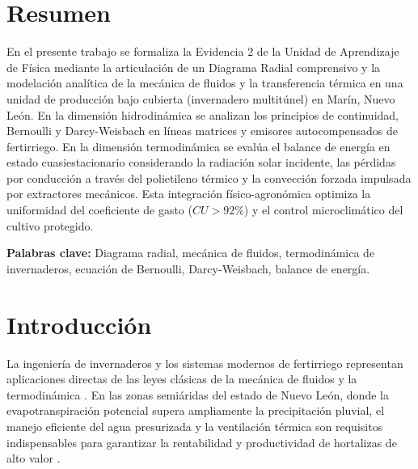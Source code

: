 \documentclass[spanish,letterpaper,oneside]{article}
\begin{document}
\hypersetup{pageanchor=false}
\begingroup
\fontsize{14}{17}\selectfont
\renewcommand{\Huge}{\fontsize{14}{17}\selectfont\bfseries}
\renewcommand{\large}{\fontsize{14}{17}\selectfont}
\templatePortrait
\clearpage
\endgroup
\hypersetup{pageanchor=true}
\templatePagecfg
\singlespacing
\setlength{\tabcolsep}{8pt}
\renewcommand{\arraystretch}{1.18}

\section*{Resumen}
En el presente trabajo se formaliza la Evidencia 2 de la Unidad de Aprendizaje de Física mediante la articulación de un Diagrama Radial comprensivo y la modelación analítica de la mecánica de fluidos y la transferencia térmica en una unidad de producción bajo cubierta (invernadero multitúnel) en Marín, Nuevo León. En la dimensión hidrodinámica se analizan los principios de continuidad, Bernoulli y Darcy-Weisbach en líneas matrices y emisores autocompensados de fertirriego. En la dimensión termodinámica se evalúa el balance de energía en estado cuasiestacionario considerando la radiación solar incidente, las pérdidas por conducción a través del polietileno térmico y la convección forzada impulsada por extractores mecánicos. Esta integración físico-agronómica optimiza la uniformidad del coeficiente de gasto ($CU > 92\%$) y el control microclimático del cultivo protegido.

\vspace{0.4cm}
\noindent\textbf{Palabras clave:} Diagrama radial, mecánica de fluidos, termodinámica de invernaderos, ecuación de Bernoulli, Darcy-Weisbach, balance de energía.

\section{Introducción}
La ingeniería de invernaderos y los sistemas modernos de fertirriego representan aplicaciones directas de las leyes clásicas de la mecánica de fluidos y la termodinámica \parencite{streeter1998,giancoli2008}. En las zonas semiáridas del estado de Nuevo León, donde la evapotranspiración potencial supera ampliamente la precipitación pluvial, el manejo eficiente del agua presurizada y la ventilación térmica son requisitos indispensables para garantizar la rentabilidad y productividad de hortalizas de alto valor \parencite{serway2018}.
\end{document}
